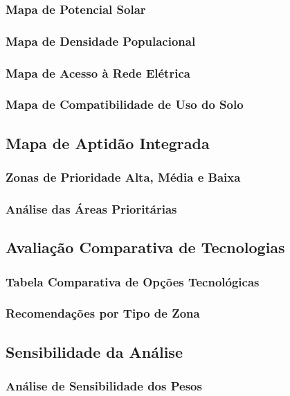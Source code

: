\documentclass[12pt, a4paper]{article}
\begin{document}
\subsubsection{Mapa de Potencial Solar}
\subsubsection{Mapa de Densidade Populacional}
\subsubsection{Mapa de Acesso à Rede Elétrica}
\subsubsection{Mapa de Compatibilidade de Uso do Solo}

\subsection{Mapa de Aptidão Integrada}
\subsubsection{Zonas de Prioridade Alta, Média e Baixa}
\subsubsection{Análise das Áreas Prioritárias}

\subsection{Avaliação Comparativa de Tecnologias}
\subsubsection{Tabela Comparativa de Opções Tecnológicas}
\subsubsection{Recomendações por Tipo de Zona}

\subsection{Sensibilidade da Análise}
\subsubsection{Análise de Sensibilidade dos Pesos}
\end{document}
